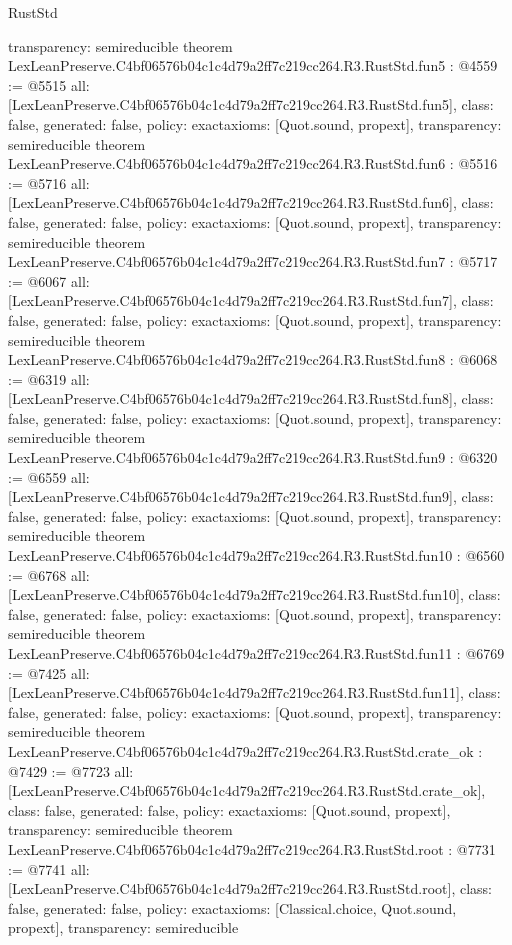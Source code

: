 \begin{lexlean}{RustStd}
\begin{coremodule}
{  transparency: semireducible
}
theorem LexLeanPreserve.C4bf06576b04c1c4d79a2ff7c219cc264.R3.RustStd.fun5 : @4559 := @5515 {
  all: [LexLeanPreserve.C4bf06576b04c1c4d79a2ff7c219cc264.R3.RustStd.fun5],
  class: false,
  generated: false,
  policy: exact{axioms: [Quot.sound, propext]},
  transparency: semireducible
}
theorem LexLeanPreserve.C4bf06576b04c1c4d79a2ff7c219cc264.R3.RustStd.fun6 : @5516 := @5716 {
  all: [LexLeanPreserve.C4bf06576b04c1c4d79a2ff7c219cc264.R3.RustStd.fun6],
  class: false,
  generated: false,
  policy: exact{axioms: [Quot.sound, propext]},
  transparency: semireducible
}
theorem LexLeanPreserve.C4bf06576b04c1c4d79a2ff7c219cc264.R3.RustStd.fun7 : @5717 := @6067 {
  all: [LexLeanPreserve.C4bf06576b04c1c4d79a2ff7c219cc264.R3.RustStd.fun7],
  class: false,
  generated: false,
  policy: exact{axioms: [Quot.sound, propext]},
  transparency: semireducible
}
theorem LexLeanPreserve.C4bf06576b04c1c4d79a2ff7c219cc264.R3.RustStd.fun8 : @6068 := @6319 {
  all: [LexLeanPreserve.C4bf06576b04c1c4d79a2ff7c219cc264.R3.RustStd.fun8],
  class: false,
  generated: false,
  policy: exact{axioms: [Quot.sound, propext]},
  transparency: semireducible
}
theorem LexLeanPreserve.C4bf06576b04c1c4d79a2ff7c219cc264.R3.RustStd.fun9 : @6320 := @6559 {
  all: [LexLeanPreserve.C4bf06576b04c1c4d79a2ff7c219cc264.R3.RustStd.fun9],
  class: false,
  generated: false,
  policy: exact{axioms: [Quot.sound, propext]},
  transparency: semireducible
}
theorem LexLeanPreserve.C4bf06576b04c1c4d79a2ff7c219cc264.R3.RustStd.fun10 : @6560 := @6768 {
  all: [LexLeanPreserve.C4bf06576b04c1c4d79a2ff7c219cc264.R3.RustStd.fun10],
  class: false,
  generated: false,
  policy: exact{axioms: [Quot.sound, propext]},
  transparency: semireducible
}
theorem LexLeanPreserve.C4bf06576b04c1c4d79a2ff7c219cc264.R3.RustStd.fun11 : @6769 := @7425 {
  all: [LexLeanPreserve.C4bf06576b04c1c4d79a2ff7c219cc264.R3.RustStd.fun11],
  class: false,
  generated: false,
  policy: exact{axioms: [Quot.sound, propext]},
  transparency: semireducible
}
theorem LexLeanPreserve.C4bf06576b04c1c4d79a2ff7c219cc264.R3.RustStd.crate_ok : @7429 := @7723 {
  all: [LexLeanPreserve.C4bf06576b04c1c4d79a2ff7c219cc264.R3.RustStd.crate_ok],
  class: false,
  generated: false,
  policy: exact{axioms: [Quot.sound, propext]},
  transparency: semireducible
}
theorem LexLeanPreserve.C4bf06576b04c1c4d79a2ff7c219cc264.R3.RustStd.root : @7731 := @7741 {
  all: [LexLeanPreserve.C4bf06576b04c1c4d79a2ff7c219cc264.R3.RustStd.root],
  class: false,
  generated: false,
  policy: exact{axioms: [Classical.choice, Quot.sound, propext]},
  transparency: semireducible
}


\end{coremodule}
\end{lexlean}
